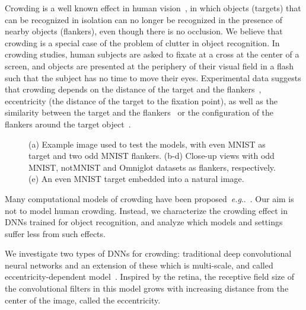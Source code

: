 \documentclass{article}
\makeatletter
\DeclareRobustCommand\onedot{\futurelet\@let@token\@onedot}
\def\@onedot{\ifx\@let@token.\else.\null\fi\xspace}
\def\eg{\emph{e.g}\onedot} \def\Eg{\emph{E.g}\onedot}
\makeatother
\begin{document}
Crowding is a well known effect in human vision~\cite{whitney2011crowding, levi2008crowding}, in which objects (targets) that can be recognized in isolation can no longer be recognized in the presence of nearby objects (flankers), even though there is no occlusion.  
We believe that crowding is a special case of the problem of clutter in object recognition. 
In crowding studies, human subjects are asked to fixate at a cross at the center of a screen, and objects are presented at the periphery of their visual field  in a flash such that the subject has no time to move their eyes.  Experimental data suggests that crowding depends on the distance of the target and the flankers~\cite{bouma1970interaction}, eccentricity (the distance of the target to the fixation point), as well as the similarity between the target and the flankers~\cite{kooi1994effect,nazir1992effects} or the configuration of the flankers around the target object~\cite{bouma1970interaction,banks1977asymmetry,francis2016grouping}. 

\begin{figure}[t!]
\centering
{}
\caption{\small(a) Example image used to test the models, with even MNIST as target and two odd MNIST flankers. (b-d) Close-up views with odd MNIST, notMNIST and Omniglot datasets as flankers, respectively. (e) An even MNIST target embedded into a natural image.\vspace*{-0.25cm}}
\label{fig:image-examples}
\end{figure}
Many computational models of crowding have been proposed~\eg~\cite{freeman2011metamers,balas2009summary}. Our aim is not to model human crowding.  Instead, we characterize the crowding effect in DNNs trained for object recognition, and analyze  which models and settings suffer less from such effects.

We investigate two types of DNNs for crowding: traditional deep convolutional neural networks and an extension of these which is multi-scale, and called eccentricity-dependent model~\cite{poggio2014computational}.  Inspired by the retina, the receptive field size of the convolutional filters in this model grows with increasing distance from the center of the image, called the eccentricity.
\end{document}
